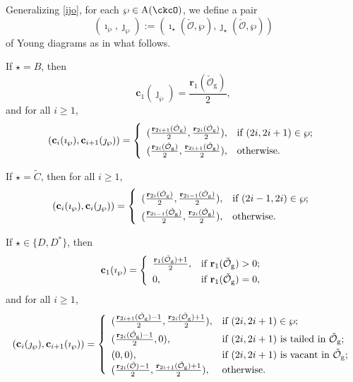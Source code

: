 \documentclass[12pt]{amsart}
\newcommand{\CO}{{\mathcal {O}}}
\numberwithin{equation}{section}
\theoremstyle{remark}
\begin{document}
  Generalizing \eqref{ijo}, for each $\wp\in  {\mathrm A}(\ckcO)$,    we define a pair \[
(\imath_\wp, \jmath_\wp):=(\imath_\star(\check \CO, \wp), \jmath_\star(\check \CO, \wp))
\]
 of Young diagrams  as in what follows.

If $\star=B$, then
 \[
   \mathbf c_{1}(\jmath_\wp)=\frac{\mathbf r_1(\check \CO_{\mathrm g})}{2},
\]
and for all $i\geq 1$,
\[
(\mathbf c_{i}(\imath_\wp), \mathbf c_{i+1}(\jmath_\wp))=
   \left\{
     \begin{array}{ll}
           (\frac{\mathbf r_{2i+1}(\check \CO_{\mathrm g})}{2},  \frac{\mathbf r_{2i}(\check \CO_{\mathrm g})}{2}), &\hbox{if $(2i, 2i+1)\in \wp$}; \smallskip\\
            (\frac{\mathbf r_{2i}(\check \CO_{\mathrm g})}{2},  \frac{\mathbf r_{2i+1}(\check \CO_{\mathrm g})}{2}), &\hbox{otherwise}.\\
            \end{array}
   \right.
\]


If $\star=\widetilde{C}$, then for all $i\geq 1$,
\[
(\mathbf c_{i}(\imath_\wp), \mathbf c_{i}(\jmath_\wp))=
   \left\{
     \begin{array}{ll}
           (\frac{\mathbf r_{2i}(\check \CO_{\mathrm g})}{2},  \frac{\mathbf r_{2i-1}(\check \CO_{\mathrm g})}{2}), &\hbox{if $(2i-1, 2i)\in \wp$}; \smallskip\\
            (\frac{\mathbf r_{2i-1}(\check \CO_{\mathrm g})}{2},  \frac{\mathbf r_{2i}(\check \CO_{\mathrm g})}{2}), &\hbox{otherwise}.\\
            \end{array}
   \right.
\]


If $\star\in\{D,D^*\}$, then
 \[
   \mathbf c_{1}(\imath_\wp)= \left\{
     \begin{array}{ll}
            \frac{\mathbf r_1(\check \CO_{\mathrm g})+1}{2},   &\hbox{if $\mathbf r_1(\check \CO_{\mathrm g})>0$}; \smallskip\\
       0,  &\hbox{if $\mathbf r_1(\check \CO_{\mathrm g})=0$},\\
            \end{array}
   \right.
 \]
and for all $i\geq 1$,
\[
(\mathbf c_{i}(\jmath_\wp), \mathbf c_{i+1}(\imath_\wp))=
   \left\{
     \begin{array}{ll}
            (\frac{\mathbf r_{2i+1}(\check \CO_{\mathrm g})-1}{2},  \frac{\mathbf r_{2i}(\check \CO_{\mathrm g})+1}{2}), &\hbox{if $(2i, 2i+1)\in \wp$}; \smallskip\\
        (\frac{\mathbf r_{2i}(\check \CO_{\mathrm g})-1}{2},  0), & \hbox{if $(2i, 2i+1)$ is tailed in $\check \CO_{\mathrm g}$};\smallskip\\
         (0,  0), &\hbox{if $(2i, 2i+1)$ is vacant in $\check \CO_{\mathrm g}$};\\
         (\frac{\mathbf r_{2i}(\check \CO)-1}{2},  \frac{\mathbf r_{2i+1}(\check \CO_{\mathrm g})+1}{2}), &\hbox{otherwise}.\\
            \end{array}
   \right.
\]
\end{document}
